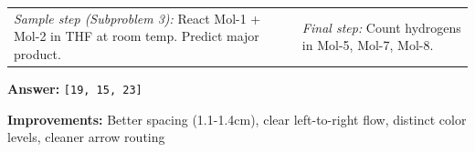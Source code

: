 \documentclass{article}
\begin{document}
\begin{tcolorbox}[
    title=\textbf{Chemistry: Reaction Cascade} \hfill {\small\colorbox{teal!20}{Medium} \quad 9 steps},
    colframe=teal!70!black,
    colback=teal!3,
    boxrule=0.8pt,
    width=\textwidth
]
\vspace{0.1cm}
\begin{tabular}{@{}p{}p{}@{}}
\textit{Sample step (Subproblem 3):} React Mol-1 + Mol-2 in THF at room temp. Predict major product. &
\textit{Final step:} Count hydrogens in Mol-5, Mol-7, Mol-8. \\
\end{tabular}

\vspace{0.25cm}
\hfill \textbf{Answer:} \texttt{[19, 15, 23]}
\end{tcolorbox}

\textbf{Improvements:} Better spacing (1.1-1.4cm), clear left-to-right flow, distinct color levels, cleaner arrow routing
\end{document}

